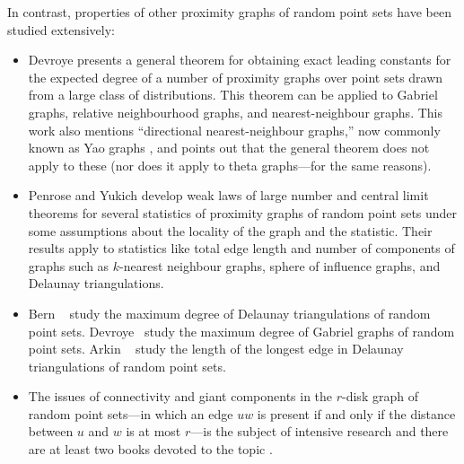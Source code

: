 \documentclass[twoside,leqno,twocolumn]{article}
\begin{document}
In contrast, properties of other proximity graphs of random point
sets have been studied extensively:  
\begin{itemize}
\item Devroye \cite{devroye:expected}
presents a general theorem for obtaining exact leading constants for the
expected degree of a number of proximity graphs over point sets drawn
from a large class of distributions.  This theorem can be applied to
Gabriel graphs, relative neighbourhood graphs, and nearest-neighbour
graphs.  This work \cite[Section~7]{devroye:expected} also mentions
``directional nearest-neighbour graphs,'' now commonly known as Yao graphs
\cite{flinchbaugh.jones:strong,yao:on}, and points out that the general
theorem does not apply to these (nor does it apply to theta graphs---for
the same reasons).

\item 
Penrose and Yukich \cite{penrose.yukich:central,penrose.yukich:weak}
develop weak laws of large number and central limit theorems for several
statistics of proximity graphs of random point sets under some assumptions
about the locality of the graph and the statistic. Their results apply
to statistics like total edge length and number of components of graphs
such as $k$-nearest neighbour graphs, sphere of influence graphs,
and Delaunay triangulations.




\item 
Bern \etal\ \cite{bern.eppstein.ea:expected} study the maximum degree
of Delaunay triangulations of random point sets.  Devroye \etal\ study
the maximum degree of Gabriel graphs \cite{devroye.gudmundsson.ea:on}
of random point sets.  Arkin \etal\ \cite{arkin.anta.ea:probabilistic}
study the length of the longest edge in Delaunay triangulations of random
point sets.

\item 
The issues of connectivity and giant components in the $r$-disk graph
of random point sets---in which an edge $uw$ is present if and only
if the distance between $u$ and $w$ is at most $r$---is the subject of
intensive research and there are at least two books devoted to the topic
\cite{meester.roy:continuum,penrose:random}.
\end{itemize}
\end{document}
